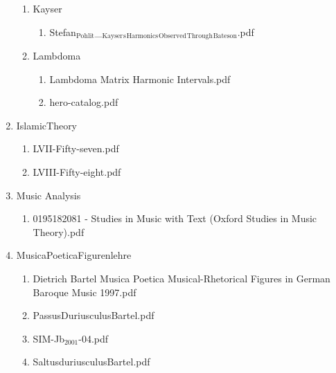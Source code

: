 \documentclass[11pt]{article}
\begin{document}
\begin{enumerate}
\begin{enumerate}
\item Kayser
\label{sec-1-1-1-1-31-12-12-2}
\begin{enumerate}
\item Stefan$_{\text{Pohlit}}$\_$_{\text{Kayser}}$$_{\text{s}}$$_{\text{Harmonics}}$$_{\text{Observed}}$$_{\text{Through}}$$_{\text{Bateson}}$.pdf
\label{sec-1-1-1-1-31-12-12-2-1}
\end{enumerate}

\item Lambdoma
\label{sec-1-1-1-1-31-12-12-3}
\begin{enumerate}
\item Lambdoma Matrix Harmonic Intervals.pdf
\label{sec-1-1-1-1-31-12-12-3-1}

\item hero-catalog.pdf
\label{sec-1-1-1-1-31-12-12-3-2}
\end{enumerate}
\end{enumerate}

\item IslamicTheory
\label{sec-1-1-1-1-31-12-13}
\begin{enumerate}
\item LVII-Fifty-seven.pdf
\label{sec-1-1-1-1-31-12-13-1}

\item LVIII-Fifty-eight.pdf
\label{sec-1-1-1-1-31-12-13-2}
\end{enumerate}

\item Music Analysis
\label{sec-1-1-1-1-31-12-14}
\begin{enumerate}
\item 0195182081 - Studies in Music with Text (Oxford Studies in Music Theory).pdf
\label{sec-1-1-1-1-31-12-14-1}
\end{enumerate}

\item MusicaPoeticaFigurenlehre
\label{sec-1-1-1-1-31-12-15}
\begin{enumerate}
\item Dietrich Bartel Musica Poetica Musical-Rhetorical Figures in German Baroque Music  1997.pdf
\label{sec-1-1-1-1-31-12-15-1}

\item PassusDuriusculusBartel.pdf
\label{sec-1-1-1-1-31-12-15-2}

\item SIM-Jb$_{\text{2001}}$-04.pdf
\label{sec-1-1-1-1-31-12-15-3}

\item SaltusduriusculusBartel.pdf
\label{sec-1-1-1-1-31-12-15-4}
\end{enumerate}


\end{enumerate}
\end{document}
